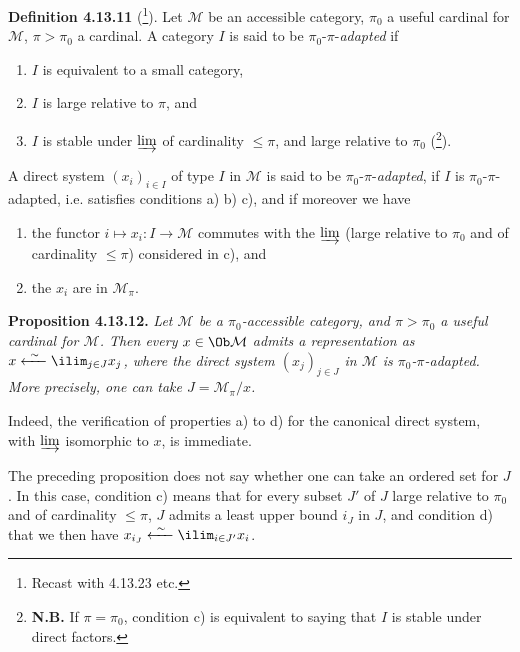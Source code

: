 
\noindent\textbf{Definition 4.13.11} (\footnote[132]{Recast with 4.13.23 etc.}). Let $\mathcal{M}$ be an accessible category, $\pi_0$ a useful cardinal for $\mathcal{M}$, $\pi > \pi_0$ a cardinal. A category $I$ is said to be $\pi_0$-$\pi$-\textit{adapted} if
\begin{enumerate}
\item[a)] $I$ is equivalent to a small category,
\item[b)] $I$ is large relative to $\pi$, and
\item[c)] $I$ is stable under $\varinjlim$ of cardinality $\leqslant \pi$, and large relative to $\pi_0$ (\footnote[133]{\textbf{N.B.} If $\pi = \pi_0$, condition c) is equivalent to saying that $I$ is stable under direct factors.}).
\end{enumerate}
\noindent A direct system $(x_i)_{i\in I}$ of type $I$ in $\mathcal{M}$ is said to be $\pi_0$-$\pi$-\textit{adapted}, if $I$ is $\pi_0$-$\pi$-adapted, i.e. satisfies conditions a) b) c), and if moreover we have
\begin{enumerate}
\item[d)] the functor $i \longmapsto x_i : I \longrightarrow \mathcal{M}$ commutes with the $\varinjlim$ (large relative to $\pi_0$ and of cardinality $\leqslant \pi$) considered in c), and
\item[e)] the $x_i$ are in $\mathcal{M}_\pi$.
\end{enumerate}

\noindent\textbf{Proposition 4.13.12.} \textit{Let $\mathcal{M}$ be a $\pi_0$-accessible category, and $\pi > \pi_0$ a useful cardinal for $\mathcal{M}$. Then every $x \in \Ob\mathcal{M}$ admits a representation as $x \xleftarrow{\ \sim\ } \ilim_{j\in J} x_j$, where the direct system $(x_j)_{j\in J}$ in $\mathcal{M}$ is $\pi_0$-$\pi$-adapted. More precisely, one can take $J = \mathcal{M}_\pi/x$.}

\noindent Indeed, the verification of properties a) to d) for the canonical direct system, with $\varinjlim$ isomorphic to $x$, is immediate.

The preceding proposition does not say whether one can take an ordered set for $J$. In this case, condition c) means that for every subset $J'$ of $J$ large relative to $\pi_0$ and of cardinality $\leqslant \pi$, $J$ admits a least upper bound $i_J$ in $J$, and condition d) that we then have $x_{i_J} \xleftarrow{\ \sim\ } \ilim_{i\in J'} x_i$.

